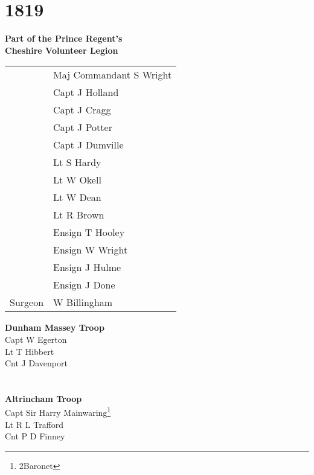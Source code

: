 \chapter*{1819}

\vspace*{10mm}

\begin{center}
  \Large
  \textbf{Part of the Prince Regent's \\ Cheshire Volunteer Legion}
\end{center}

\vspace*{5mm}

\begin{center}
  \begin{tabular}{rl}
    & Maj Commandant S Wright \\
    & Capt J Holland \\
    & Capt J Cragg \\
    & Capt J Potter \\
    & Capt J Dumville \\
    & Lt S Hardy \\
    & Lt W Okell \\
    & Lt W Dean \\
    & Lt R Brown \\
    & Ensign T Hooley \\
    & Ensign W Wright \\
    & Ensign J Hulme \\
    & Ensign J Done \\
    Surgeon & W Billingham \\
  \end{tabular}
\end{center}

\vspace*{5mm}

\begin{multicols}{1}
  \noindent
  \textbf{Dunham Massey Troop} \\
  Capt W Egerton \\
  Lt T Hibbert \\
  Cnt J Davenport \\
  \\
  \\
  \textbf{Altrincham Troop} \\
  Capt Sir Harry Mainwaring\footnote{2\nd Baronet} \\
  Lt R L Trafford \\
  Cnt P D Finney \\
\end{multicols}
